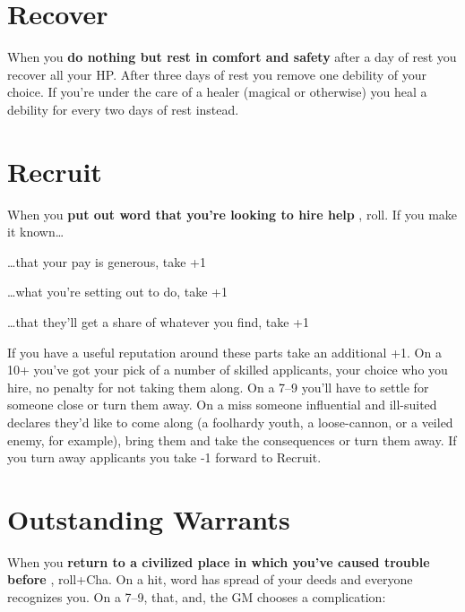  
\section{Recover}   
 

When you {\bf do nothing but rest in comfort and safety}  after a day of rest you recover all your HP. After three days of rest you remove one debility of your choice. If you're under the care of a healer (magical or otherwise) you heal a debility for every two days of rest instead.

 
\section{Recruit}   
 

When you {\bf put out word that you're looking to hire help} , roll. If you make it known…

 
\startitemize[1,packed]

\item …that your pay is generous, take +1

 
\item …what you're setting out to do, take +1

 
\item …that they'll get a share of whatever you find, take +1


\stopitemize
 

If you have a useful reputation around these parts take an additional +1. On a 10+ you've got your pick of a number of skilled applicants, your choice who you hire, no penalty for not taking them along. On a 7–9 you'll have to settle for someone close or turn them away. On a miss someone influential and ill-suited declares they'd like to come along (a foolhardy youth, a loose-cannon, or a veiled enemy, for example), bring them and take the consequences or turn them away. If you turn away applicants you take -1 forward to Recruit.

 
\section{Outstanding Warrants}   
 

When you {\bf return to a civilized place in which you've caused trouble before} , roll+Cha. On a hit, word has spread of your deeds and everyone recognizes you. On a 7–9, that, and, the GM chooses a complication:

